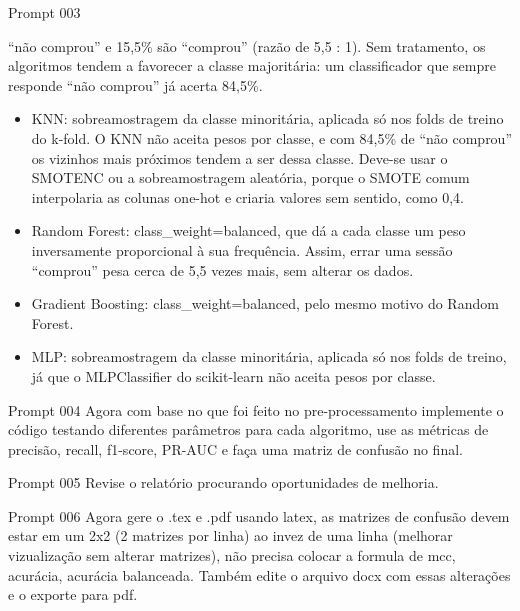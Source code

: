 \documentclass[11pt,a4paper]{article}
\begin{document}
\begin{prompt}{Prompt 003}
\begin{itemize}
        ``não comprou'' e 15,5\% são ``comprou'' (razão de 5,5 : 1). Sem tratamento, os algoritmos tendem a favorecer
        a classe majoritária: um classificador que sempre responde ``não comprou'' já acerta 84,5\%.
        \begin{itemize}
          \item[--] KNN: sobreamostragem da classe minoritária, aplicada só nos folds de treino do k-fold. O KNN não
                aceita pesos por classe, e com 84,5\% de ``não comprou'' os vizinhos mais próximos tendem a ser dessa
                classe. Deve-se usar o SMOTENC ou a sobreamostragem aleatória, porque o SMOTE comum interpolaria as
                colunas one-hot e criaria valores sem sentido, como 0,4.
          \item[--] Random Forest: class\_weight=\textquotedbl balanced\textquotedbl, que dá a cada classe um peso
                inversamente proporcional à sua frequência. Assim, errar uma sessão ``comprou'' pesa cerca de 5,5
                vezes mais, sem alterar os dados.
          \item[--] Gradient Boosting: class\_weight=\textquotedbl balanced\textquotedbl, pelo mesmo motivo do Random
                Forest.
          \item[--] MLP: sobreamostragem da classe minoritária, aplicada só nos folds de treino, já que o
                MLPClassifier do scikit-learn não aceita pesos por classe.
        \end{itemize}
\end{itemize}
\end{prompt}

\begin{prompt}{Prompt 004}
Agora com base no que foi feito no pre-processamento implemente o código testando diferentes parâmetros para cada
algoritmo, use as métricas de precisão, recall, f1-score, PR-AUC e faça uma matriz de confusão no final.
\end{prompt}

\begin{prompt}{Prompt 005}
Revise o relatório procurando oportunidades de melhoria.
\end{prompt}

\begin{prompt}{Prompt 006}
Agora gere o .tex e .pdf usando latex, as matrizes de confusão devem estar em um 2x2 (2 matrizes por linha) ao invez
de uma linha (melhorar vizualização sem alterar matrizes), não precisa colocar a formula de mcc, acurácia, acurácia
balanceada. Também edite o arquivo docx com essas alterações e o exporte para pdf.
\end{prompt}
\end{document}
